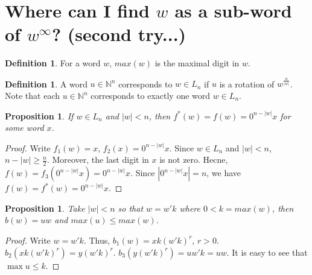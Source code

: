 \documentclass{article}
\newtheorem{proposition}[theorem]{Proposition}
\theoremstyle{definition}
\newtheorem{definition}[theorem]{Definition}
\begin{document}
\section{Where can I find $w$ as a sub-word of $w^\infty$? (second try...)}


\begin{definition}
	For a word $w$, $max(w)$ is the maximal digit in $w$.
\end{definition}

\begin{definition}
	A word $u\in \mathbb{N}^n$ corresponds to $w\in L_n$ if $u$ is a rotation of $w^{\frac{n}{|w|}}$. Note that each $u\in \mathbb{N}^n$ corresponds to exactly one word $w\in L_n$.
\end{definition}

\begin{proposition}
	\label{newforward}
	If $w\in L_n$ and $|w|<n$, then $f^*(w)=f(w)=0^{n-|w|}x$ for some word $x$.
\end{proposition}
\begin{proof}
	Write $f_1(w)=x$, $f_2(x)=0^{n-|w|}x$. Since $w\in L_n$ and $|w|<n$, $n-|w|\geq \frac{n}{2}$. Moreover, the last digit in $x$ is not zero. Hecne, $f(w)=f_3(0^{n-|w|}x)=0^{n-|w|}x$. Since $|0^{n-|w|}x|=n$, we have $f(w)=f^*(w)=0^{n-|w|}x$.
\end{proof}

\begin{proposition}
	\label{1-back}
	Take $|w|<n$ so that $w=w'k$ where $0<k=max(w)$, then $b(w)=uw$ and $max(u)\leq max(w)$. 
\end{proposition}
\begin{proof}
	Write $w=w'k$. Thus, $b_1(w)=xk(w'k)^r$, $r>0$. $b_2(xk(w'k)^r)=y(w'k)^r$. $b_3(y(w'k)^r)=uw'k=uw$. It is easy to see that $\max{u}\leq k$.
\end{proof}


\end{document}
